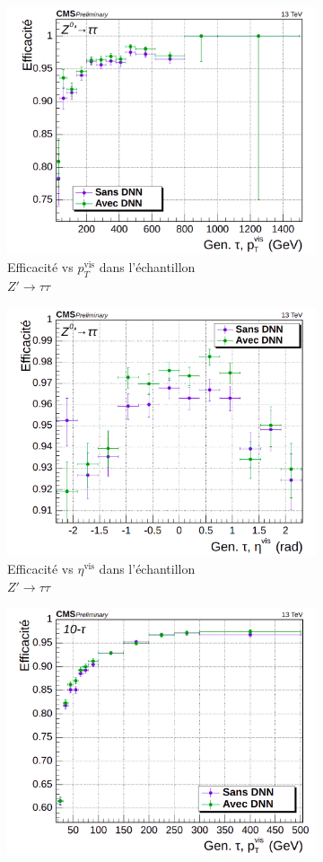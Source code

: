 \begin{figure}[!ht]
\begin{subfigure}{0.5\linewidth}
    \includegraphics[width=0.8\linewidth]{Chapitre4/Images/HPSnewDMs_zptt_pt.png} 
    \caption{Efficacité vs $p_T^{\text{vis}}$ dans l'échantillon \\ $Z'\rightarrow\tau\tau$} 
  \end{subfigure}
  \begin{subfigure}{0.5\linewidth}
    \centering
    \includegraphics[width=0.8\linewidth]{Chapitre4/Images/HPSnewDMs_zptt_eta.png} 
    \caption{Efficacité vs $\eta^{\text{vis}}$ dans l'échantillon \\ $Z'\rightarrow\tau\tau$} 
  \end{subfigure}
  \begin{subfigure}{0.5\linewidth}
    \centering
    \includegraphics[width=0.8\linewidth]{Chapitre4/Images/HPSnewDMs_10t_pt.png} 

\end{subfigure}
\end{figure}

